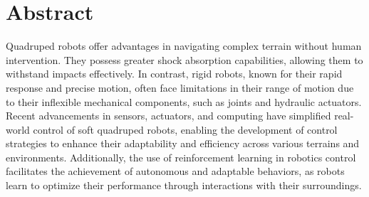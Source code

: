 

%     

\newpage
{}
\chapter*{Abstract}

Quadruped robots offer advantages in navigating complex terrain without human intervention. They possess greater shock absorption capabilities, allowing them to withstand impacts effectively. In contrast, rigid robots, known for their rapid response and precise motion, often face limitations in their range of motion due to their inflexible mechanical components, such as joints and hydraulic actuators. Recent advancements in sensors, actuators, and computing have simplified real-world control of soft quadruped robots, enabling the development of control strategies to enhance their adaptability and efficiency across various terrains and environments. Additionally, the use of reinforcement learning in robotics control facilitates the achievement of autonomous and adaptable behaviors, as robots learn to optimize their performance through interactions with their surroundings.

